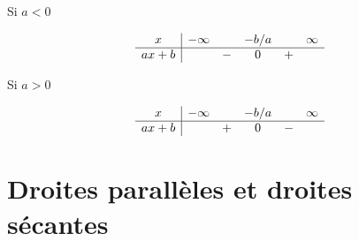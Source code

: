\begin{minipage}{0.485\textwidth}
    \begin{center}

        Si \( a<0\)
        \vspace{5mm}

                  

               \begin{equation*}
                   \begin{array}[]{c|ccccc}
                        x&-\infty&&-b/a&&\infty\\
                         \hline
                         ax+b&&-&0&+&\\ 
                          \end{array}
                      \end{equation*}
    \end{center}
\end{minipage}
\hspace{1mm}
\begin{minipage}{0.485\textwidth}
    \begin{center}
        Si \( a>0\)
        \vspace{5mm}

                    

               \begin{equation*}
                   \begin{array}[]{c|ccccc}
                        x&-\infty&&-b/a&&\infty\\
                         \hline
                         ax+b&&+&0&-&\\ 
                          \end{array}
                      \end{equation*}
    \end{center}
\end{minipage}


\section{Droites parallèles et droites sécantes}

